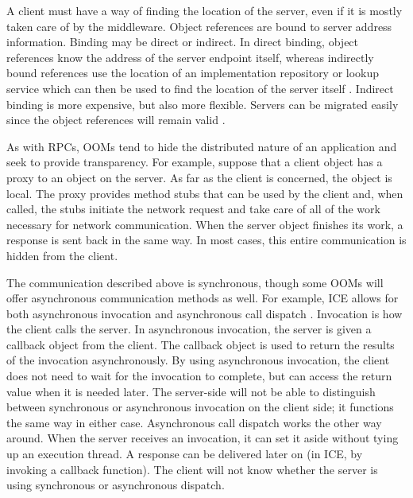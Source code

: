 \documentclass{acm_proc_article-sp}
\begin{document}
A client must have a way of finding the location of the server, even if it is mostly taken care of by the middleware.  Object references are bound to server address information.  Binding may be direct or indirect.  In direct binding, object references know the address of the server endpoint itself, whereas indirectly bound references use the location of an implementation repository or lookup service which can then be used to find the location of the server itself \cite{Henning:2004p8372}.  Indirect binding is more expensive, but also more flexible.  Servers can be migrated easily since the object references will remain valid \cite{icemanual}.

As with RPCs, OOMs tend to hide the distributed nature of an application and seek to provide transparency.  For example, suppose that a client object has a proxy to an object on the server.  As far as the client is concerned, the object is local.  The proxy provides method stubs that can be used by the client and, when called, the stubs initiate the network request and take care of all of the work necessary for network communication.  When the server object finishes its work, a response is sent back in the same way.  In most cases, this entire communication is hidden from the client.

The communication described above is synchronous, though some OOMs will offer asynchronous communication methods as well.  For example, ICE allows for both asynchronous invocation and asynchronous call dispatch \cite{Henning:2004p8372}.  Invocation is how the client calls the server.  In asynchronous invocation, the server is given a callback object from the client.  The callback object is used to return the results of the invocation asynchronously.  By using asynchronous invocation, the client does not need to wait for the invocation to complete, but can access the return value when it is needed later.  The server-side will not be able to distinguish between synchronous or asynchronous invocation on the client side; it functions the same way in either case.  Asynchronous call dispatch works the other way around.  When the server receives an invocation, it can set it aside without tying up an execution thread.  A response can be delivered later on (in ICE, by invoking a callback function).  The client will not know whether the server is using synchronous or asynchronous dispatch.
\end{document}
